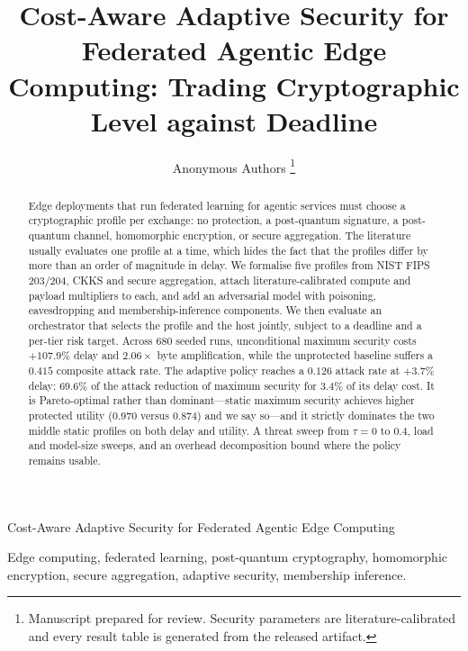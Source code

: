 \documentclass[journal,10pt]{IEEEtran}
\begin{document}
\title{Cost-Aware Adaptive Security for Federated Agentic Edge Computing:
Trading Cryptographic Level against Deadline}

\author{Anonymous Authors%
\thanks{Manuscript prepared for review. Security parameters are
literature-calibrated and every result table is generated from the released
artifact.}}

%
{Cost-Aware Adaptive Security for Federated Agentic Edge Computing}

\maketitle

\begin{abstract}
Edge deployments that run federated learning for agentic services must choose a
cryptographic profile per exchange: no protection, a post-quantum signature, a
post-quantum channel, homomorphic encryption, or secure aggregation. The
literature usually evaluates one profile at a time, which hides the fact that
the profiles differ by more than an order of magnitude in delay. We formalise
five profiles from NIST FIPS 203/204, CKKS and secure aggregation, attach
literature-calibrated compute and payload multipliers to each, and add an
adversarial model with poisoning, eavesdropping and membership-inference
components. We then evaluate an orchestrator that selects the profile and the
host jointly, subject to a deadline and a per-tier risk target. Across $680$
seeded runs, unconditional maximum security costs $+107.9\%$ delay and
$2.06\times$ byte amplification, while the unprotected baseline suffers a
$0.415$ composite attack rate. The adaptive policy reaches a $0.126$ attack
rate at $+3.7\%$ delay: $69.6\%$ of the attack reduction of maximum security for
$3.4\%$ of its delay cost. It is Pareto-optimal rather than dominant---static
maximum security achieves higher protected utility ($0.970$ versus $0.874$) and
we say so---and it strictly dominates the two middle static profiles on both
delay and utility. A threat sweep from $\tau=0$ to $0.4$, load and model-size
sweeps, and an overhead decomposition bound where the policy remains usable.
\end{abstract}

\begin{IEEEkeywords}
Edge computing, federated learning, post-quantum cryptography, homomorphic
encryption, secure aggregation, adaptive security, membership inference.
\end{IEEEkeywords}
\end{document}
